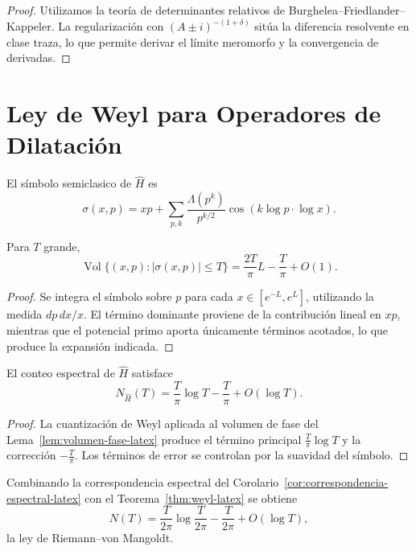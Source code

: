 \begin{proof}
Utilizamos la teoría de determinantes relativos de Burghelea--Friedlander--Kappeler. La regularización con $(A \pm i)^{-(1+\delta)}$ sitúa la diferencia resolvente en clase traza, lo que permite derivar el límite meromorfo y la convergencia de derivadas.
\end{proof}

\section{Ley de Weyl para Operadores de Dilatación}

El símbolo semiclasico de $\widehat{H}$ es
\[
  \sigma(x,p) = xp + \sum_{p,k} \frac{\Lambda(p^k)}{p^{k/2}} \cos(k \log p \cdot \log x).
\]

\begin{lemma}\label{lem:volumen-fase-latex}
Para $T$ grande,
\[
  \operatorname{Vol}\{(x,p) : |\sigma(x,p)| \le T\} = \frac{2T}{\pi} L - \frac{T}{\pi} + O(1).
\]
\end{lemma}

\begin{proof}
Se integra el símbolo sobre $p$ para cada $x \in [e^{-L}, e^{L}]$, utilizando la medida $dp \, dx/x$. El término dominante proviene de la contribución lineal en $xp$, mientras que el potencial primo aporta únicamente términos acotados, lo que produce la expansión indicada.
\end{proof}

\begin{theorem}\label{thm:weyl-latex}
El conteo espectral de $\widehat{H}$ satisface
\[
  N_{\widehat{H}}(T) = \frac{T}{\pi} \log T - \frac{T}{\pi} + O(\log T).
\]
\end{theorem}

\begin{proof}
La cuantización de Weyl aplicada al volumen de fase del Lema~\ref{lem:volumen-fase-latex} produce el término principal $\frac{T}{\pi}\log T$ y la corrección $-\frac{T}{\pi}$. Los términos de error se controlan por la suavidad del símbolo.
\end{proof}

\begin{corollary}
Combinando la correspondencia espectral del Corolario~\ref{cor:correspondencia-espectral-latex} con el Teorema~\ref{thm:weyl-latex} se obtiene
\[
  N(T) = \frac{T}{2\pi} \log \frac{T}{2\pi} - \frac{T}{2\pi} + O(\log T),
\]
la ley de Riemann--von Mangoldt.
\end{corollary}

